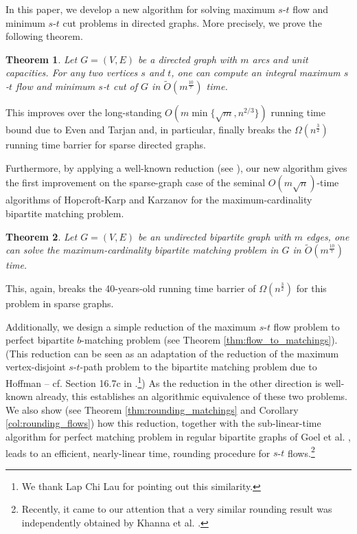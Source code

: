 \documentclass[11pt, letterpaper]{article}
\newtheorem{theorem}{Theorem}[section]
\newcommand{\tO}[1]{\widetilde{O}(#1)}
\newcommand{\bb}{\boldsymbol{\mathit{b}}}
\begin{document}
In this paper, we develop a new algorithm for solving maximum $s$-$t$ flow and minimum $s$-$t$ cut problems in directed graphs. More precisely, we prove the following theorem.
  
\begin{theorem}\label{thm:main}
Let $G=(V,E)$ be a directed graph with $m$ arcs and unit capacities. For any two vertices $s$ and $t$, one can compute an integral maximum $s$-$t$ flow and minimum $s$-$t$ cut of $G$ in $\tO{m^{\frac{10}{7}}}$ time.
\end{theorem}

This improves over the long-standing $O(m\min\{\sqrt{m},n^{2/3}\})$ running time bound due to Even and Tarjan \cite{EvenT75} and, in particular, finally breaks the $\Omega(n^{\frac{3}{2}})$ running time barrier for sparse directed graphs.  


Furthermore, by applying a well-known reduction (see \cite{CormenLRS09}), our new algorithm gives the first improvement on the sparse-graph case of the seminal $O(m\sqrt{n})$-time algorithms of Hopcroft-Karp \cite{HopcroftK73} and Karzanov \cite{Karzanov73} for the maximum-cardinality bipartite matching problem. 

\begin{theorem}\label{thm:main_matchings}
Let $G=(V,E)$ be an undirected bipartite graph with $m$ edges, one can solve the maximum-cardinality bipartite matching problem in $G$ in $\tO{m^{\frac{10}{7}}}$ time. 
\end{theorem}

\noindent This, again, breaks the 40-years-old running time barrier of $\Omega(n^{\frac{3}{2}})$ for this problem in sparse graphs. 

Additionally, we design a simple reduction of the maximum $s$-$t$ flow problem to perfect bipartite $\bb$-matching problem (see Theorem \ref{thm:flow_to_matchings}). (This reduction can be seen as an adaptation of the reduction of the maximum vertex-disjoint $s$-$t$-path problem to the bipartite matching problem due to Hoffman \cite{Hoffman60} -- cf. Section 16.7c in \cite{Schrijver03}.\footnote{We thank Lap Chi Lau \cite{Lau13} for pointing out this similarity.}) As the reduction in the other direction is well-known already, this establishes an algorithmic equivalence of these two problems. We also show (see Theorem \ref{thm:rounding_matchings} and Corollary \ref{col:rounding_flows}) how this reduction, together with the sub-linear-time algorithm for perfect matching problem in regular bipartite graphs of Goel et al. \cite{GoelKK10}, leads to an efficient, nearly-linear time, rounding procedure for $s$-$t$ flows.\footnote{Recently, it came to our attention that a very similar rounding result was independently obtained by Khanna et al. \cite{KhannaKL13}.}
\end{document}
